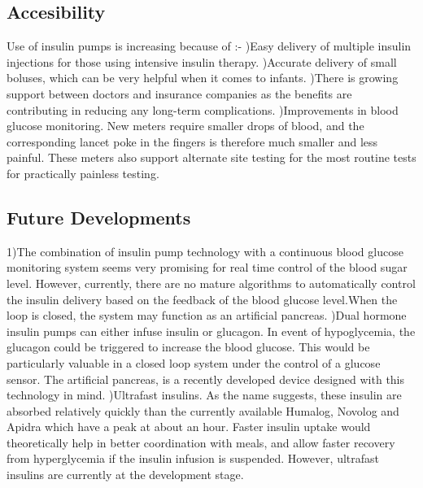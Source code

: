 \documentclass[12pt]{article}
\begin{document}
\begin{normalsize}
\subsection{Accesibility}
Use of insulin pumps is increasing because of :-
\linebreak
{})Easy delivery of multiple insulin injections for those using intensive insulin therapy.
)Accurate delivery of small boluses, which can be very helpful when it comes to infants.
)There is growing support between doctors and insurance companies as the benefits are contributing in reducing any long-term complications.
)Improvements in blood glucose monitoring. New meters require smaller drops of blood, and the corresponding lancet poke in the fingers is therefore much smaller and less painful. These meters also support alternate site testing for the most routine tests for practically painless testing.

\subsection{Future Developments}
1)The combination of insulin pump technology with a continuous blood glucose monitoring system seems very promising for real time control of the blood sugar level. However, currently, there are no mature algorithms to automatically control the insulin delivery based on the feedback of the blood glucose level.When the loop is closed, the system may function as an artificial pancreas.
)Dual hormone insulin pumps can either infuse insulin or glucagon. In event of hypoglycemia, the glucagon could be triggered to increase the blood glucose. This would be particularly valuable in a closed loop system under the control of a glucose sensor. The artificial pancreas, is a recently developed device designed with this technology in mind.
)Ultrafast insulins. As the name suggests, these insulin are absorbed relatively quickly than the currently available Humalog, Novolog and Apidra which have a peak at about an hour. Faster insulin uptake would theoretically help in better coordination with meals, and allow faster recovery from hyperglycemia if the insulin infusion is suspended. However, ultrafast insulins are currently at the development stage.
\clearpage


\end{normalsize}
\end{document}
